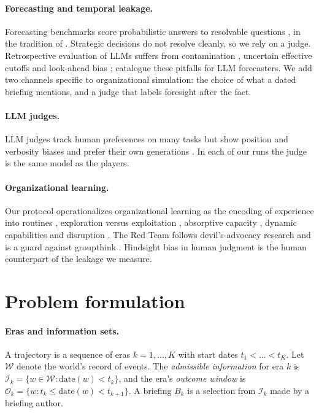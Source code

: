 \documentclass[11pt]{article}
\theoremstyle{definition}
\begin{document}
\paragraph{Forecasting and temporal leakage.} Forecasting benchmarks score probabilistic answers to resolvable questions \citep{zou2022autocast,halawi2024forecasting,karger2024forecastbench}, in the tradition of \citet{tetlock2005expert,tetlock2015superforecasting}. Strategic decisions do not resolve cleanly, so we rely on a judge. Retrospective evaluation of LLMs suffers from contamination \citep{sainz2023trouble,golchin2024timetravel}, uncertain effective cutoffs \citep{cheng2024dated} and look-ahead bias \citep{glasserman2023lookahead}; \citet{paleka2026pitfalls} catalogue these pitfalls for LLM forecasters. We add two channels specific to organizational simulation: the choice of what a dated briefing mentions, and a judge that labels foresight after the fact.

\paragraph{LLM judges.} LLM judges track human preferences on many tasks but show position and verbosity biases \citep{zheng2023judging,wang2023notfair} and prefer their own generations \citep{panickssery2024selfpref}. In each of our runs the judge is the same model as the players.

\paragraph{Organizational learning.} Our protocol operationalizes organizational learning as the encoding of experience into routines \citep{levitt1988organizational}, exploration versus exploitation \citep{march1991exploration}, absorptive capacity \citep{cohen1990absorptive}, dynamic capabilities \citep{teece1997dynamic} and disruption \citep{christensen1997innovator}. The Red Team follows devil's-advocacy research \citep{schwenk1990devils} and is a guard against groupthink \citep{janis1972groupthink}. Hindsight bias in human judgment \citep{fischhoff1975hindsight,roese2012hindsight} is the human counterpart of the leakage we measure.

\section{Problem formulation}
\label{sec:formulation}

\paragraph{Eras and information sets.} A trajectory is a sequence of eras $k=1,\dots,K$ with start dates $t_1<\dots<t_K$. Let $\mathcal{W}$ denote the world's record of events. The \emph{admissible information} for era $k$ is $\mathcal{I}_k=\{w\in\mathcal{W}:\text{date}(w)<t_k\}$, and the era's \emph{outcome window} is $\mathcal{O}_k=\{w:t_k\le\text{date}(w)<t_{k+1}\}$. A briefing $B_k$ is a selection from $\mathcal{I}_k$ made by a briefing author.
\end{document}
